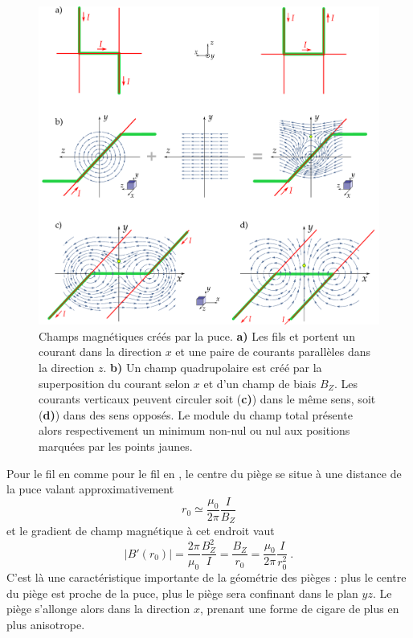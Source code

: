 \begin{figure}[!h]
\centering
\includegraphics[width=\linewidth]{figures/setup/coldatoms/magfields_chip}
\caption[Champs magnétiques créés par la puce]{
Champs magnétiques créés par la puce.
\textbf{a)} Les fils  et  portent un courant dans la direction $x$ et une paire de courants parallèles dans la direction $z$.
\textbf{b)} Un champ quadrupolaire est créé par la superposition du courant selon $x$ et d'un champ de biais $B_Z$.
Les courants verticaux peuvent circuler soit (\textbf{c)}) dans le même sens,  soit (\textbf{d)}) dans des sens opposés.
Le module du champ total présente alors respectivement un minimum non-nul ou nul aux positions marquées par les points jaunes.
}
\label{fig:magfields_chip}
\end{figure}

Pour le fil en  comme pour le fil en , le centre du piège se situe à une distance de la puce valant approximativement
\begin{equation}
\label{eq:trap_center}
r_0 \simeq \frac{\mu _0}{2\pi}\frac{I}{B_Z}
\end{equation}
et le gradient de champ magnétique à cet endroit vaut
\begin{equation}
\label{eq:trap_center_grad}
|B'(r_0)|=\frac{2\pi}{\mu _0} \frac{B_Z^2}{I} = \frac{B_Z}{r_0} = \frac{\mu _0}{2\pi}\frac{I}{r_0^2}~.
\end{equation}
%
C'est là une caractéristique importante de la géométrie des pièges : plus le centre du piège est proche de la puce, plus le piège sera confinant dans le plan $yz$.
Le piège s'allonge alors dans la direction $x$, prenant une forme de cigare de plus en plus anisotrope.

